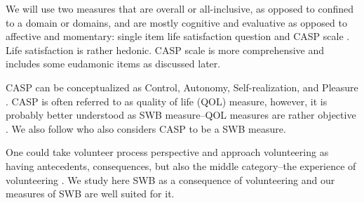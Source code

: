 \documentclass[10pt, letterpaper]{article}
\begin{document}
\begin{spacing}{1.4}
We will use two measures that are overall or all-inclusive, as opposed to
confined to a domain or domains, and are mostly cognitive and evaluative
as opposed to affective and momentary: single item life satisfaction question
and CASP scale \citep{hyde03,hyde15}. Life satisfaction is rather hedonic. CASP
scale is more comprehensive and includes some eudamonic items as discussed later.

CASP can be conceptualized as Control, Autonomy, Self-realization, and Pleasure \citep{hyde03,hyde15}.
CASP is often referred to as quality of life (QOL) measure, however, it is probably better understood as SWB measure--QOL measures are rather
objective \citep{aok13liavbility,aok-swbLivability18}. We also follow
\citet{vanhoutte12,vanhoutte14} who also considers CASP to be a SWB measure.

One could take volunteer process perspective and approach volunteering
as having antecedents, consequences, but also the middle category--the
experience of volunteering \citep{wilson12B}. We study here SWB as a consequence
of volunteering and our measures of SWB are well suited for it.




\end{spacing}
\end{document}
